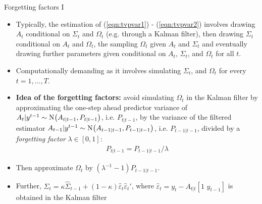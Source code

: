 \documentclass[9pt,xcolor=x11names,compress]{beamer}
\newcommand{\rbtext}[1]{\textcolor{dred}{\textbf{#1}}}
\theoremstyle{standard}
\theoremstyle{notes}
\newcommand{\No}[1]{\text{N}\hspace{-0.05cm}\left(#1\right)}
\begin{document}
\begin{frame}{Forgetting factors I}
	\begin{itemize}
		\item Typically, the estimation of (\ref{eqn:tvpvar1}) - (\ref{eqn:tvpvar2}) involves drawing $A_t$ conditional on $\Sigma_t$ and $\Omega_t$ (e.g. through a Kalman filter), then drawing $\Sigma_t$ conditional on $A_t$ and $\Omega_t$, the sampling $\Omega_t$ given $A_t$ and $\Sigma_t$ and eventually drawing further parameters given conditional on $A_t$, $\Sigma_t$, and $\Omega_t$ for all $t$. 
		\item Computationally demanding as it involves simulating $\Sigma_t$, and $\Omega_t$ for every $t=1,\ldots,T$.
		\pause
		\item \rbtext{Idea of the forgetting factors:} avoid simulating $\Omega_t$ in the Kalman filter by approximating the one-step ahead predictor variance of $A_t|y^{t-1}\sim\No{A_{t|t-1},P_{t|t-1}}$, i.e. $P_{t|t-1}$, by the variance of the filtered estimator $A_{t-1}|y^{t-1}\sim\No{A_{t-1|t-1},P_{t-1|t-1}}$, i.e. $P_{t-1|t-1}$, divided by a \textit{forgetting factor} $\lambda\in[0,1]$:
		\begin{align}
		P_{t|t-1}=P_{t-1|t-1}\big/\lambda
		\end{align}
		\item Then approximate $\Omega_t$ by $(\lambda^{-1}-1)P_{t-1|t-1}$.
		\item Further, $\hat{\Sigma}_t=\kappa\hat{\Sigma}_{t-1}+(1-\kappa)\hat{\varepsilon}_t\hat{\varepsilon}_t'$, where $\hat{\varepsilon}_t=y_t-A_{t|t}[1\,\,y_{t-1}]$ is obtained in the Kalman filter
	\end{itemize}
\end{frame}
\end{document}
